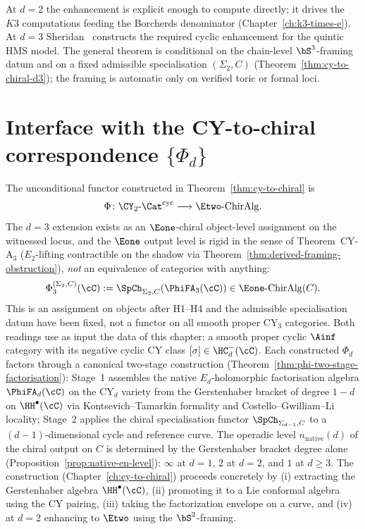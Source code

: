 At $d = 2$ the enhancement is explicit enough to compute directly; it drives the $K3$ computations feeding the Borcherds denominator (Chapter~\ref{ch:k3-times-e}). At $d = 3$ Sheridan~\cite{Sheridan2015} constructs the required cyclic enhancement for the quintic HMS model. The general theorem is conditional on the chain-level $\bS^3$-framing datum and on a fixed admissible specialisation $(\Sigma_2,C)$ (Theorem~\ref{thm:cy-to-chiral-d3}); the framing is automatic only on verified toric or formal loci.

\section{Interface with the CY-to-chiral correspondence \texorpdfstring{$\{\Phi_d\}$}{Phi-d}}
\label{sec:cy-cat-phi-interface}

The unconditional functor constructed in Theorem~\ref{thm:cy-to-chiral} is
\[
 \Phi \colon \CY_2\text{-}\Cat^{\mathrm{cyc}} \longrightarrow \Etwo\text{-}\mathrm{ChirAlg}.
\]
The $d = 3$ extension exists as an $\Eone$-chiral object-level
assignment on the witnessed locus, and the $\Eone$ output level is
rigid in the sense of Theorem~CY-A$_3$
($E_2$-lifting contractible on the shadow via
Theorem~\ref{thm:derived-framing-obstruction}), \emph{not} an
equivalence of categories with anything:
\[
 \Phi_3^{(\Sigma_2,C)}(\cC)
 :=
 \SpCh_{\Sigma_2,C}(\PhiFA_3(\cC))
 \in \Eone\text{-}\mathrm{ChirAlg}(C).
\]
This is an assignment on objects after H1--H4 and the admissible specialisation datum have been fixed, not a functor on all smooth proper CY$_3$ categories. Both readings use as input the data of this chapter: a smooth proper cyclic $\Ainf$ category with its negative cyclic CY class $[\sigma] \in \HC^-_d(\cC)$. Each constructed $\Phi_d$ factors through a canonical two-stage construction (Theorem~\ref{thm:phi-two-stage-factorisation}): Stage~1 assembles the native $E_d$-holomorphic factorisation algebra $\PhiFA_d(\cC)$ on the CY$_d$ variety from the Gerstenhaber bracket of degree $1-d$ on $\HH^\bullet(\cC)$ via Kontsevich--Tamarkin formality and Costello--Gwilliam--Li locality; Stage~2 applies the chiral specialisation functor $\SpCh_{\Sigma_{d-1},C}$ to a $(d-1)$-dimensional cycle and reference curve. The operadic level $n_{\mathrm{native}}(d)$ of the chiral output on $C$ is determined by the Gerstenhaber bracket degree alone (Proposition~\ref{prop:native-en-level}): $\infty$ at $d=1$, $2$ at $d=2$, and $1$ at $d \geq 3$. The construction (Chapter~\ref{ch:cy-to-chiral}) proceeds concretely by (i) extracting the Gerstenhaber algebra $\HH^\bullet(\cC)$, (ii) promoting it to a Lie conformal algebra using the CY pairing, (iii) taking the factorization envelope on a curve, and (iv) at $d = 2$ enhancing to $\Etwo$ using the $\bS^2$-framing.

